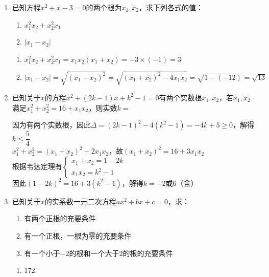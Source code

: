 \begin{enumerate}
    \item 已知方程$x^2+x-3=0$的两个根为$x_1, x_2$，求下列各式的值：
    \begin{enumerate}
        \item $x_1^2x_2 + x_2^2x_1$
        \item $|x_1 - x_2|$
    \end{enumerate}
    \begin{jieda}
        \begin{enumerate}
            \item $x_1^2x_2 + x_2^2x_1 = x_1x_2(x_1 + x_2) = -3 \times (-1) = 3$
            \item $|x_1 - x_2| = \sqrt{(x_1 - x_2)^2} = \sqrt{(x_1 + x_2)^2 - 4x_1x_2} = \sqrt{1 - (-12)} = \sqrt{13}$
        \end{enumerate}
    \end{jieda}
    \item 已知关于$x$的方程$x^2+(2k-1)x+k^2-1 = 0$有两个实数根$x_1, x_2$，若$x_1, x_2$满足$x_1^2+x_2^2 = 16+x_1x_2$，则实数$k = $
    \begin{jieda}
        因为有两个实数根，因此$\Delta = (2k-1)^2 - 4(k^2-1) = -4k+5 \geq 0$，解得$k \leq \dfrac{5}{4}$ \\
        $x_1^2+x_2^2 = (x_1+x_2)^2 - 2x_1x_2$，故$(x_1+x_2)^2 = 16+3x_1x_2$ \\
        根据韦达定理有$\left \{ \begin{array}{l}
             x_1+x_2 = 1-2k \\
             x_1x_2 = k^2-1
        \end{array} \right.$ \\
        因此$(1-2k)^2 = 16+3(k^2-1)$，解得$k = -2$或$6$（舍）
    \end{jieda}
    \item 已知关于$x$的实系数一元二次方程$ax^2+bx+c=0$，求：
    \begin{enumerate}
        \item 有两个正根的充要条件
        \item 有一个正根，一根为零的充要条件
        \item 有一个小于$-2$的根和一个大于$2$的根的充要条件
    \end{enumerate}
    \begin{jieda}
        \begin{enumerate}
            \item 
            \begin{dingautolist}{172}

\end{dingautolist}
\end{enumerate}
\end{jieda}
\end{enumerate}
